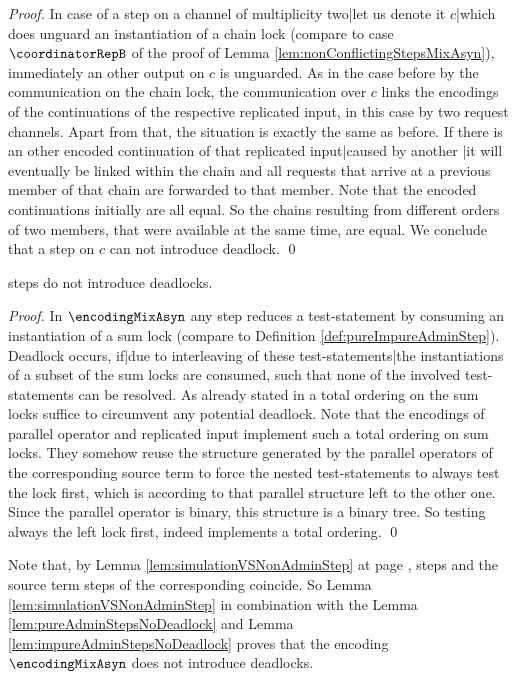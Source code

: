 \documentclass[]{llncs}
\begin{document}
\begin{proof}
	In case of a step on a channel of multiplicity two|let us denote it $ c $|which does unguard an instantiation of a chain lock (compare to case $ \coordinatorRepB $ of the proof of Lemma \ref{lem:nonConflictingStepsMixAsyn}), immediately an other output on $ c $ is unguarded. As in the case before by the communication on the chain lock, the communication over $ c $ links the encodings of the continuations of the respective replicated input, in this case by two request channels. Apart from that, the situation is exactly the same as before. If there is an other encoded continuation of that replicated input|caused by another \simulation\!\!|it will eventually be linked within the chain and all requests that arrive at a previous member of that chain are forwarded to that member. Note that the encoded continuations initially are all equal. So the chains resulting from different orders of two members, that were available at the same time, are equal. We conclude that a step on $ c $ can not introduce deadlock.
	\qed
\end{proof}

\begin{lemma} \label{lem:impureAdminStepsNoDeadlock}
	\Impure \admin steps do not introduce deadlocks.
\end{lemma}

\begin{proof}
	In $ \encodingMixAsyn $ any \impure \admin step reduces a test-statement by consuming an instantiation of a sum lock (compare to Definition \ref{def:pureImpureAdminStep}). Deadlock occurs, if|due to interleaving of these test-statements|the instantiations of a subset of the sum locks are consumed, such that none of the involved test-statements can be resolved. As already stated in \cite{nestmann00} a total ordering on the sum locks suffice to circumvent any potential deadlock. Note that the encodings of parallel operator and replicated input implement such a total ordering on sum locks. They somehow reuse the structure generated by the parallel operators of the corresponding source term to force the nested test-statements to always test the lock first, which is according to that parallel structure left to the other one. Since the parallel operator is binary, this structure is a binary tree. So testing always the left lock first, indeed implements a total ordering.
	\qed
\end{proof}

Note that, by Lemma \ref{lem:simulationVSNonAdminStep} at page \pageref{lem:simulationVSNonAdminStep}, \nonAdmin steps and the source term steps of the corresponding \simulations coincide. So Lemma \ref{lem:simulationVSNonAdminStep} in combination with the Lemma \ref{lem:pureAdminStepsNoDeadlock} and Lemma \ref{lem:impureAdminStepsNoDeadlock} proves that the encoding $ \encodingMixAsyn $ does not introduce deadlocks.
\end{document}
